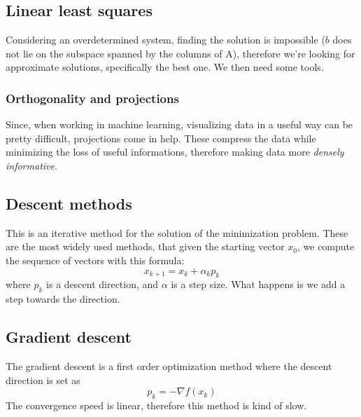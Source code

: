 \documentclass[11pt]{article}
\begin{document}
\subsection{Linear least squares}
Considering an overdetermined system, finding the solution is impossible ($b$ does not lie on the subspace spanned by the columns of A), therefore we're looking for approximate solutions, specifically the best one. We then need some tools.

\subsubsection{Orthogonality and projections}
Since, when working in machine learning, visualizing data in a useful way can be pretty difficult, projections come in help. These compress the data while minimizing the loss of useful informations, therefore making data more \textit{densely informative}. 
\subsection{Descent methods}
This is an iterative method for the solution of the minimization problem. These are the most widely used methods, that given the starting vector $x_0$, we compute the sequence of vectors with this formula:
\begin{displaymath}
    x_{k+1}=x_k+\alpha_kp_k
\end{displaymath}
where $p_k$ is a descent direction, and $\alpha$ is a step size. What happens is we add a step towards the direction.
\subsection{Gradient descent} 
The gradient descent is a first order optimization method where the descent direction is set as
\begin{displaymath}
    p_k = -\nabla f(x_k) 
\end{displaymath}
The convergence speed is linear, therefore this method is kind of slow. 
\end{document}

